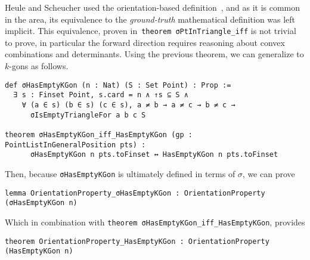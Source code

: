 



Heule and Scheucher used the orientation-based definition~\cite{emptyHexagonNumber}, and as it is common in the area, its equivalence to the \emph{ground-truth} mathematical definition was left implicit. This equivalence, proven in~\lstinline|theorem σPtInTriangle_iff| is not trivial to prove, in particular the forward direction requires reasoning about convex combinations and determinants.
Using the previous theorem, we can generalize to $k$-gons as follows.
\begin{lstlisting}
def σHasEmptyKGon (n : Nat) (S : Set Point) : Prop :=
  ∃ s : Finset Point, s.card = n ∧ ↑s ⊆ S ∧
    ∀ (a ∈ s) (b ∈ s) (c ∈ s), a ≠ b → a ≠ c → b ≠ c →
      σIsEmptyTriangleFor a b c S

theorem σHasEmptyKGon_iff_HasEmptyKGon (gp : PointListInGeneralPosition pts) :
      σHasEmptyKGon n pts.toFinset ↔ HasEmptyKGon n pts.toFinset
\end{lstlisting}

Then, because \lstinline|σHasEmptyKGon| is ultimately defined in terms of $\sigma$, we can prove
\begin{lstlisting}
lemma OrientationProperty_σHasEmptyKGon : OrientationProperty (σHasEmptyKGon n)
\end{lstlisting}
Which in combination with \lstinline|theorem σHasEmptyKGon_iff_HasEmptyKGon|, provides
\begin{lstlisting}
theorem OrientationProperty_HasEmptyKGon : OrientationProperty (HasEmptyKGon n)
\end{lstlisting}

